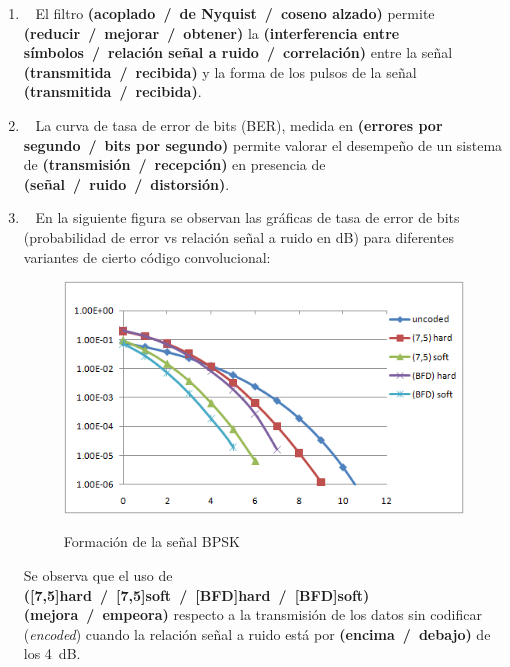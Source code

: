 \begin{enumerate}
\begin{enumerate}
\begin{enumerate}
			\item~ El filtro \textbf{(acoplado~/~de Nyquist~/~coseno alzado)} permite \textbf{(reducir~/~mejorar~/~obtener)} la \textbf{(interferencia entre símbolos~/~relación señal a ruido~/~correlación)} entre la señal \textbf{(transmitida~/~recibida)} y la forma de los pulsos de la señal \textbf{(transmitida~/~recibida)}.
			
			\item~ La curva de tasa de error de bits (BER), medida en \textbf{(errores por segundo~/~bits por segundo)} permite valorar el desempeño de un sistema de \textbf{(transmisión~/~recepción)} en presencia de \textbf{(señal~/~ruido~/~distorsión)}.
			
			\item~ En la siguiente figura se observan las gráficas de tasa de error de bits (probabilidad de error vs relación señal a ruido en dB) para diferentes variantes de cierto código convolucional:
		
		
		
\begin{figure}[h!]
	\captionsetup{justification = raggedright, singlelinecheck = false}
	\caption{Formación de la señal BPSK} 
	\centering
	\includegraphics[scale=1]{Imagenes/Ber1.png}
	\label{fig:Ber1}
\end{figure}		
		
			Se observa que el uso de \textbf{([7,5]hard~/~[7,5]soft~/~[BFD]hard~/~[BFD]soft)}  \textbf{(mejora~/~empeora)} respecto a la transmisión de los datos sin codificar (\textit{encoded}) cuando la relación señal a ruido está por \textbf{(encima~/~debajo)} de los 4~dB. 
		\end{enumerate}
		

\end{enumerate}
\end{enumerate}
